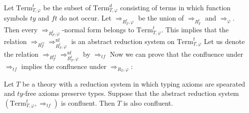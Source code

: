 \documentclass[reqno]{amsart}
\theoremstyle{definition}
\theoremstyle{remark}
\newcommand{\nf}{\mathrm{nf}}
\newcommand{\Term}{\mathrm{Term}}
\newcommand{\ft}{\mathit{ft}}
\newcommand{\ty}{\mathit{ty}}
\numberwithin{figure}{section}
\begin{document}
Let $\Term_{T,\varphi}^t$ be the subset of $\Term_{T,\varphi}^d$ consisting of terms in which function symbols $\ty$ and $\ft$ do not occur.
Let $\Rightarrow_{R_T^t,\varphi}$ be the union of $\Rightarrow_{R^t_T}$ and $\Rightarrow_\varphi$.
Then every $\Rightarrow_{R_T^t,\varphi}$-normal form belongs to $\Term_{T,\varphi}^t$.
This implies that the relation $\Rightarrow_{R^{tf}_T} \Rightarrow_{R^t_T,\varphi}^\nf$ is an abstract reduction system on $\Term_{T,\varphi}^t$
Let us denote the relation $\Rightarrow_{R^{tf}_T} \Rightarrow_{R^t_T,\varphi}^\nf$ by $\Rightarrow_{tf}$
Now we can prove that the confluence under $\Rightarrow_{tf}$ implies the confluence under $\Rightarrow_{R_T,\varphi}$:

\begin{prop}[ty-elim]
Let $T$ be a theory with a reduction system in which typing axioms are spearated and $\ty$-free axioms preserve types.
Suppose that the abstract reduction system $(\Term_{T,\varphi}^t, \Rightarrow_{tf})$ is confluent.
Then $T$ is also confluent.
\end{prop}
\end{document}
